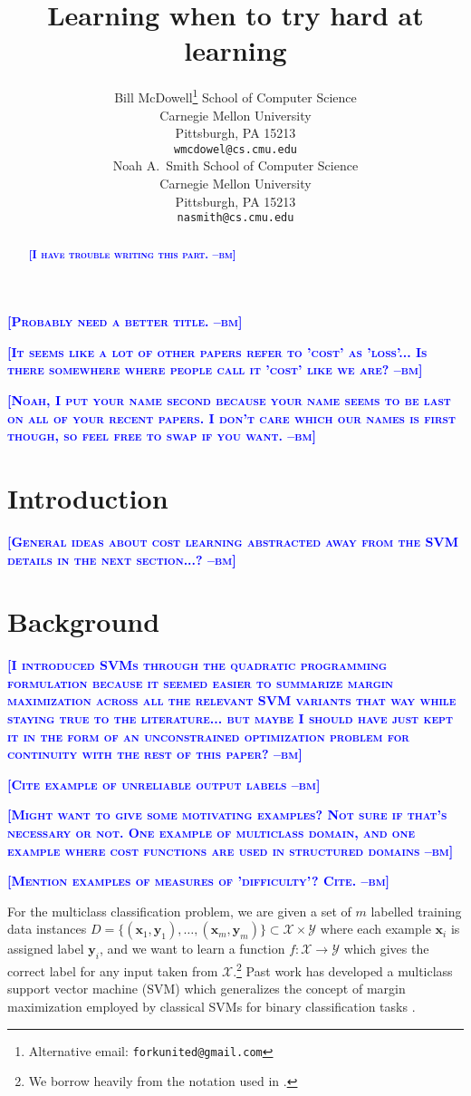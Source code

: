 \documentclass{article} %
\title{Learning when to try hard at learning}
\author{
Bill McDowell\thanks{Alternative email: \texttt{forkunited@gmail.com}}
School of Computer Science\\
Carnegie Mellon University\\
Pittsburgh, PA 15213 \\
\texttt{wmcdowel@cs.cmu.edu} \\
\And
Noah A.~Smith
School of Computer Science\\
Carnegie Mellon University\\
Pittsburgh, PA 15213 \\
\texttt{nasmith@cs.cmu.edu} \\
}
\newcommand{\bmcomment}[1]{\textcolor{blue}{\textsc{\textbf{[#1 --bm]}}}}
\begin{document}
\maketitle

\bmcomment{Probably need a better title.}

\bmcomment{It seems like a lot of other papers refer to 'cost' as 'loss'... 
Is there somewhere where people call it 'cost' like we are?}

\bmcomment{Noah, I put your name second because your name seems 
to be last on all of your recent papers.  I don't care which our names is
first though, so feel free to swap if you want.}

\begin{abstract}
\bmcomment{I have trouble writing this part.}
\end{abstract}

\section{Introduction}

\bmcomment{General ideas about cost learning abstracted away
from the SVM details in the next section...?}

\section{Background}

\bmcomment{I introduced SVMs through the quadratic programming
formulation because it seemed easier to summarize margin maximization
across all the relevant SVM variants that way while staying true to the literature... 
but maybe I should have just kept it in the form
of an unconstrained optimization problem for continuity with the rest
of this paper?}

\bmcomment{Cite example of unreliable output labels}

\bmcomment{Might want to give some motivating examples? Not sure if that's
necessary or not. One example of multiclass domain, and one example where
cost functions are used in structured domains}

\bmcomment{Mention examples of measures of 'difficulty'? Cite.}

For the multiclass classification problem, we are given a set of
$m$ labelled training data instances
$D=\{(\mathbf{x}_1,\mathbf{y}_1),\hdots,(\mathbf{x}_m, \mathbf{y}_m)\}\subset\mathcal{X}\times\mathcal{Y}$ 
where each example $\mathbf{x}_i$ is assigned label 
$\mathbf{y}_i$, and we want to learn a function 
$f:\mathcal{X}\rightarrow\mathcal{Y}$ which gives the correct
label for any input taken from $\mathcal{X}$.\footnote{
We borrow heavily from the notation used in \citep{tsochantaridis2004support}.
}  Past work has developed
a multiclass support vector machine (SVM) which generalizes the 
concept of margin maximization employed by classical SVMs for binary
classification tasks
\citep{vapnik1998statistical}\citep{crammer2002algorithmic}\citep{weston1998multi}. 
\end{document}
